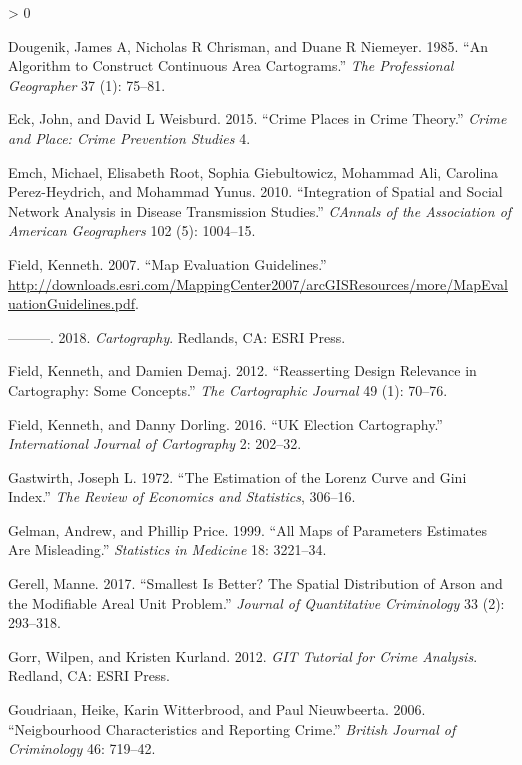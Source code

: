 \documentclass[
  krantz2]{krantz}
\newlength{\cslhangindent}
\newenvironment{CSLReferences}[2] %
 {%
  \setlength{\parindent}{0pt}
  \ifodd #1 \everypar{\setlength{\hangindent}{\cslhangindent}}\ignorespaces\fi
  \ifnum #2 > 0
  \setlength{\parskip}{#2\baselineskip}
  \fi
 }%
 {}
\begin{document}
\begin{CSLReferences}{1}{0}
\leavevmode\hypertarget{ref-Dougenik_1985}{}%
Dougenik, James A, Nicholas R Chrisman, and Duane R Niemeyer. 1985. {``An Algorithm to Construct Continuous Area Cartograms.''} \emph{The Professional Geographer} 37 (1): 75--81.

\leavevmode\hypertarget{ref-Eck_2015}{}%
Eck, John, and David L Weisburd. 2015. {``Crime Places in Crime Theory.''} \emph{Crime and Place: Crime Prevention Studies} 4.

\leavevmode\hypertarget{ref-Emch_2010}{}%
Emch, Michael, Elisabeth Root, Sophia Giebultowicz, Mohammad Ali, Carolina Perez-Heydrich, and Mohammad Yunus. 2010. {``Integration of Spatial and Social Network Analysis in Disease Transmission Studies.''} \emph{CAnnals of the Association of American Geographers} 102 (5): 1004--15.

\leavevmode\hypertarget{ref-Field_2007}{}%
Field, Kenneth. 2007. {``Map Evaluation Guidelines.''} \url{http://downloads.esri.com/MappingCenter2007/arcGISResources/more/MapEvaluationGuidelines.pdf}.

\leavevmode\hypertarget{ref-Field_2018}{}%
---------. 2018. \emph{Cartography}. Redlands, CA: ESRI Press.

\leavevmode\hypertarget{ref-Field_2012}{}%
Field, Kenneth, and Damien Demaj. 2012. {``Reasserting Design Relevance in Cartography: Some Concepts.''} \emph{The Cartographic Journal} 49 (1): 70--76.

\leavevmode\hypertarget{ref-Field_2016}{}%
Field, Kenneth, and Danny Dorling. 2016. {``UK Election Cartography.''} \emph{International Journal of Cartography} 2: 202--32.

\leavevmode\hypertarget{ref-gastwirth1972estimation}{}%
Gastwirth, Joseph L. 1972. {``The Estimation of the Lorenz Curve and Gini Index.''} \emph{The Review of Economics and Statistics}, 306--16.

\leavevmode\hypertarget{ref-Gelman_1999}{}%
Gelman, Andrew, and Phillip Price. 1999. {``All Maps of Parameters Estimates Are Misleading.''} \emph{Statistics in Medicine} 18: 3221--34.

\leavevmode\hypertarget{ref-Gerell_2017}{}%
Gerell, Manne. 2017. {``Smallest Is Better? The Spatial Distribution of Arson and the Modifiable Areal Unit Problem.''} \emph{Journal of Quantitative Criminology} 33 (2): 293--318.

\leavevmode\hypertarget{ref-Gorr_2012}{}%
Gorr, Wilpen, and Kristen Kurland. 2012. \emph{GIT Tutorial for Crime Analysis}. Redland, CA: ESRI Press.

\leavevmode\hypertarget{ref-Goudriaan_2006}{}%
Goudriaan, Heike, Karin Witterbrood, and Paul Nieuwbeerta. 2006. {``Neigbourhood Characteristics and Reporting Crime.''} \emph{British Journal of Criminology} 46: 719--42.


\end{CSLReferences}
\end{document}
